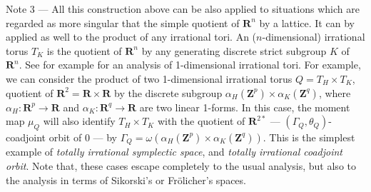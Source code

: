 \documentclass[10pt,reqno,twoside]{amsart}
\newcommand{\RR}{\mathbf{R}}
\newcommand{\ZZ}{\mathbf{Z}}
\renewcommand{\ZZ}{\mathbf{Z}}
\newcommand{\T}{T}
\theoremstyle{plain}
\theoremstyle{definition}
\begin{document}
  {\sc Note 3} --- All this construction above can be also applied to situations which are regarded as more singular that the simple quotient of $\RR^n$ by a lattice.
  It can by applied as well to the product of any irrational tori.
  An ($n$-dimensional) irrational torus $\T_K$ is the quotient of $\RR^n$ by any generating discrete strict subgroup $K$ of $\RR^n$.
  See for example \cite{IL90} for an analysis of 1-dimensional irrational tori.
  For example,
  we can consider the product of two 1-dimensional irrational torus $Q = {\T}_{H} \times {\T}_{K}$,
  quotient of $\RR^2 = \RR\times \RR$ by the discrete subgroup $\alpha_{H}(\ZZ^p) \times \alpha_{K}(\ZZ^q)$,
  where $\alpha_H : \RR^p \to \RR$ and $\alpha_K : \RR^q \to \RR$ are two linear 1-forms.
  In this case,
  the moment map $\mu_Q$ will also identify ${\T}_{H} \times {\T}_{K}$ with the quotient of $\RR^{2*}$ --- $(\Gamma_Q,\theta_Q)$-coadjoint orbit of $0$ --- by $\Gamma_Q = \omega(\alpha_{H}(\ZZ^p) \times \alpha_{K}(\ZZ^q))$.
  This is the simplest example of {\em totally irrational symplectic space},
  and {\em totally irrational coadjoint orbit}.
  Note that,
  these cases escape completely to the usual analysis,
  but also to the analysis in terms of Sikorski's or Fr\"olicher's spaces.
  
\end{document}
